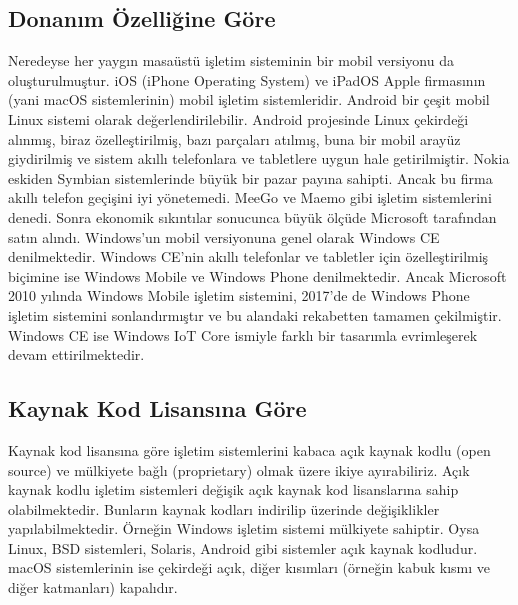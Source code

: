 \documentclass[a4paper,10pt,turkish]{sphinxmanual}
\begin{document}
\subsection{Donanım Özelliğine Göre}
\label{\detokenize{introduction:donanim-ozelligine-gore}}
\sphinxAtStartPar
Neredeyse her yaygın masaüstü işletim sisteminin bir mobil versiyonu da oluşturulmuştur.
iOS (iPhone Operating System) ve iPadOS Apple firmasının (yani macOS sistemlerinin) mobil
işletim sistemleridir. Android bir çeşit mobil Linux sistemi olarak değerlendirilebilir.
Android projesinde Linux çekirdeği alınmış, biraz özelleştirilmiş, bazı parçaları atılmış,
buna bir mobil arayüz giydirilmiş ve sistem akıllı telefonlara ve tabletlere uygun hale
getirilmiştir. Nokia eskiden Symbian sistemlerinde büyük bir pazar payına sahipti. Ancak
bu firma akıllı telefon geçişini iyi yönetemedi. MeeGo ve Maemo gibi işletim sistemlerini
denedi. Sonra ekonomik sıkıntılar sonucunca büyük ölçüde Microsoft tarafından satın alındı.
Windows’un mobil versiyonuna genel olarak Windows CE denilmektedir. Windows CE’nin akıllı
telefonlar ve tabletler için özelleştirilmiş biçimine ise Windows Mobile ve Windows Phone
denilmektedir. Ancak Microsoft 2010 yılında Windows Mobile işletim sistemini, 2017’de de
Windows Phone işletim sistemini sonlandırmıştır ve bu alandaki rekabetten tamamen
çekilmiştir. Windows CE ise Windows IoT Core ismiyle farklı bir tasarımla evrimleşerek
devam ettirilmektedir.


\subsection{Kaynak Kod Lisansına Göre}
\label{\detokenize{introduction:kaynak-kod-lisansina-gore}}
\sphinxAtStartPar
Kaynak kod lisansına göre işletim sistemlerini kabaca açık kaynak kodlu (open source) ve
mülkiyete bağlı (proprietary) olmak üzere ikiye ayırabiliriz. Açık kaynak kodlu işletim
sistemleri değişik açık kaynak kod lisanslarına sahip olabilmektedir. Bunların kaynak
kodları indirilip üzerinde değişiklikler yapılabilmektedir. Örneğin Windows işletim sistemi
mülkiyete sahiptir. Oysa Linux, BSD sistemleri, Solaris, Android gibi sistemler açık kaynak
kodludur. macOS sistemlerinin ise çekirdeği açık, diğer kısımları (örneğin kabuk kısmı ve
diğer katmanları) kapalıdır.
\end{document}
